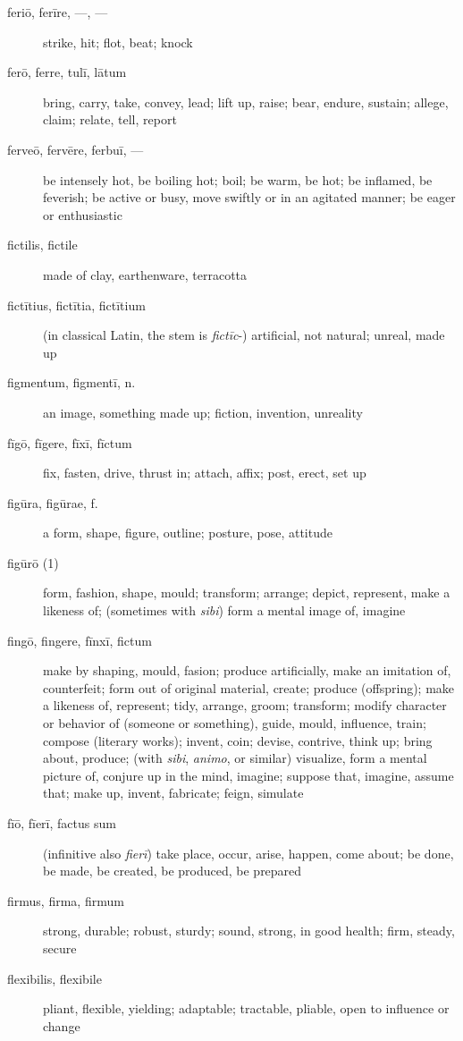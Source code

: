 \begin{description}
    \item[feriō, ferīre, ---, ---] strike, hit; flot, beat; knock
    \item[ferō, ferre, tulī, lātum] bring, carry, take, convey, lead; lift up, raise; bear, endure, sustain; allege, claim; relate, tell, report
    \item[ferveō, fervēre, ferbuī, ---] be intensely hot, be boiling hot; boil; be warm, be hot; be inflamed, be feverish; be active or busy, move swiftly or in an agitated manner; be eager or enthusiastic
    \item[fictilis, fictile] made of clay, earthenware, terracotta
    \item[fictītius, fictītia, fictītium]  (in classical Latin, the stem is \textit{fictīc}-) artificial, not natural; unreal, made up
    \item[figmentum, figmentī, n.] an image, something made up; fiction, invention, unreality
    \item[fīgō, fīgere, fīxī, fīctum] fix, fasten, drive, thrust in; attach, affix; post, erect, set up
    \item[figūra, figūrae, f.] a form, shape, figure, outline; posture, pose, attitude
    \item[figūrō (1)] form, fashion, shape, mould; transform; arrange; depict, represent, make a likeness of; (sometimes with \textit{sibi}) form a mental image of, imagine
    \item[fingō, fingere, fīnxī, fictum] make by shaping, mould, fasion; produce artificially, make an imitation of, counterfeit; form out of original material, create; produce (offspring); make a likeness of, represent; tidy, arrange, groom; transform; modify character or behavior of (someone or something), guide, mould, influence, train; compose (literary works); invent, coin; devise, contrive, think up; bring about, produce; (with \textit{sibi}, \textit{animo}, or similar) visualize, form a mental picture of, conjure up in the mind, imagine; suppose that, imagine, assume that; make up, invent, fabricate; feign, simulate
    \item[fīō, fīerī, factus sum] (infinitive also \textit{fierī}) take place, occur, arise, happen, come about; be done, be made, be created, be produced, be prepared
    \item[firmus, firma, firmum] strong, durable; robust, sturdy; sound, strong, in good health; firm, steady, secure
    \item[flexibilis, flexibile] pliant, flexible, yielding; adaptable; tractable, pliable, open to influence or change

\end{description}
